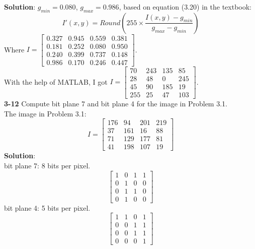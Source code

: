\documentclass[a4paper]{article}
\begin{document}
\begin{spacing}{2.0}
	\textbf{Solution}: $g_{min} = 0.080$, $g_{max} = 0.986$, based on equation (3.20) in the textbook:
	$$I'(x, y) = Round(255\times\displaystyle\frac{I(x,y) - g_{min}}{g_{max} - g_{min} })$$
	Where $I = \left[\begin{matrix} 0.327 & 0.945 & 0.559 & 0.381 \\ 0.181 & 0.252 & 0.080 & 0.950 \\ 0.240 & 0.399 & 0.737 & 0.148 \\ 0.986 & 0.170 & 0.246 & 0.447 \end{matrix}\right]$.\\
	With the help of MATLAB, I got $I = \left[\begin{matrix} 70 & 243 & 135 & 85 \\ 28 & 48 & 0 & 245 \\ 45 & 90 & 185 & 19 \\ 255 & 25 & 47 & 103 \end{matrix}\right]$.\\
	
	\noindent
	\textbf{3-12} Compute bit plane 7 and bit plane 4 for the image in Problem 3.1.\\
	The image in Problem 3.1: $$I = \left[\begin{matrix} 176 & 94 & 201 & 219 \\ 37 & 161 & 16 & 88 \\ 71 & 129 & 177 & 81 \\ 41 & 198 & 107 & 19\end{matrix}\right]$$
	\textbf{Solution}:\\
	\renewcommand\arraystretch{0.65}
	bit plane 7: 8 bits per pixel. $$\left[\begin{matrix} 1 & 0 & 1 & 1 \\ 0 & 1 & 0 & 0 \\ 0 & 1 & 1 & 0 \\ 0 & 1 & 0 & 0\end{matrix}\right]$$
	bit plane 4: 5 bits per pixel. $$\begin{bmatrix} 1 & 1 & 0 & 1 \\ 0 & 0 & 1 & 1 \\ 0 & 0 & 1 & 1 \\ 0 & 0 & 0 & 1\end{bmatrix}$$


\end{spacing}
\end{document}
